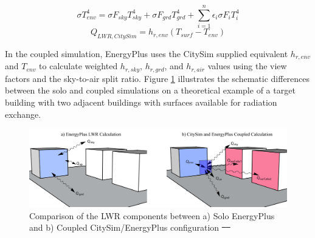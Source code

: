 \documentclass{tBPS2e}
\theoremstyle{plain}
\theoremstyle{definition}
\theoremstyle{remark}
\providecommand{\DIFadd}[1]{{\protect\color{blue}\uwave{#1}}} %
\providecommand{\DIFdel}[1]{{\protect\color{red}\sout{#1}}}                      %
\providecommand{\DIFaddFL}[1]{\DIFadd{#1}} %
\providecommand{\DIFdelFL}[1]{\DIFdel{#1}} %
\providecommand{\DIFaddbeginFL}{} %
\providecommand{\DIFaddendFL}{} %
\providecommand{\DIFdelbeginFL}{} %
\providecommand{\DIFdelendFL}{} %
\begin{document}
\begin{equation} \label{CitySim_Tenv} 
\sigma T_{env}^4 = \sigma F_{sky}T_{sky}^4 +\sigma F_{grd}T_{grd}^4 + \sum_{i=1}^{n} \epsilon_i \sigma F_{i}T_{i}^4
\end{equation}
\begin{equation} \label{CitySim_LWR_Ext} 
Q_{LWR,CitySim} = h_{r,env}(T_{surf}-T_{env})
\end{equation}

In the coupled simulation, EnergyPlus uses the CitySim supplied equivalent
$h_{r,env}$ and $T_{env}$ to calculate weighted $h_{r,sky}$, $h_{r,grd}$, and
$h_{r,air}$ values using the view factors and the sky-to-air split ratio.
Figure \ref{combinedLWR} illustrates the schematic differences between the
solo and coupled simulations on a theoretical example of a target building
with two adjacent buildings with surfaces available for radiation exchange.

\begin{figure}[H]
  \centering
  \includegraphics[width=1.0\textwidth]{figures/LWRCalc_Combined_V3}
  \caption{Comparison of the LWR components between a) Solo EnergyPlus and b) Coupled CitySim/EnergyPlus configuration \DIFdelbeginFL \DIFdelFL{\mbox{%
\citep{miller_long_2015}
  }%
}\DIFdelendFL \DIFaddbeginFL \DIFaddFL{\mbox{%
\citep{Miller:2015vk}
  }%
}\DIFaddendFL \label{combinedLWR}}
\end{figure}
\end{document}
